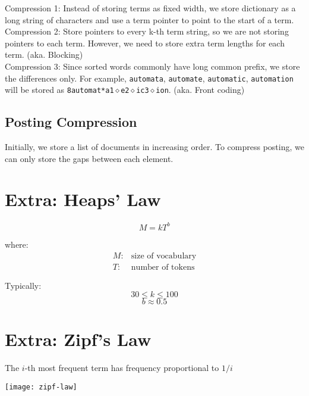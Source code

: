 \begin{multicols*}{2}
\noindent Compression 1: Instead of storing terms as fixed width, we store dictionary as a long string of characters and use a term pointer to point to the start of a term.\\

\noindent Compression 2: Store pointers to every k-th term string, so we are not storing pointers to each term. However, we need to store extra term lengths for each term. (aka. Blocking)\\

\noindent Compression 3: Since sorted words commonly have long common prefix, we store the differences only. For example, \verb|automata|, \verb|automate|, \verb|automatic|, \verb|automation| will be stored as \verb|8automat*a1|$\diamond$\verb|e2|$\diamond$\verb|ic3|$\diamond$\verb|ion|. (aka. Front coding)

\subsection{Posting Compression}
Initially, we store a list of documents in increasing order. To compress posting, we can only store the gaps between each element. 

\section{Extra: Heaps’ Law}
$$M=kT^b$$

\noindent where:
\begin{equation*}
\begin{split}
    M: & \text{size of vocabulary} \\
    T: & \text{number of tokens}
\end{split}
\end{equation*}

\noindent Typically: 
$$30 \le k \le 100$$
$$b \approx 0.5$$

\section{Extra: Zipf’s Law}
The $i$-th most frequent term has frequency proportional to $1 / i$
\begin{center}
\texttt{[image: zipf-law]}
\end{center}

\end{multicols*}
